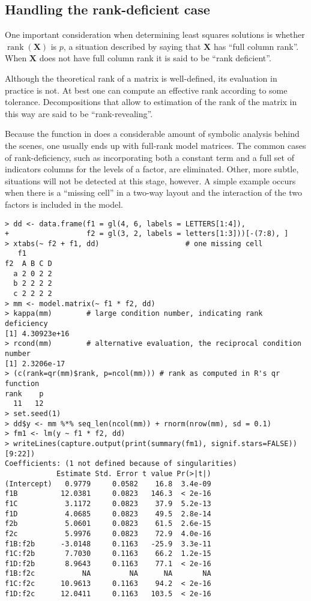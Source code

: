 \documentclass[shortnames,article,nojss]{jss}
\newcommand{\rank}{\operatorname{rank}}
\begin{document}
\subsection{Handling the rank-deficient case}
\label{sec:rankdeficient}

One important consideration when determining least squares solutions
is whether $\rank(\bm X)$ is $p$, a situation described by saying
that $\bm X$ has ``full column rank''.   When $\bm X$ does not have
full column rank it is said to be ``rank deficient''.

Although the theoretical rank of a matrix is well-defined, its
evaluation in practice is not.  At best one can compute an effective
rank according to some tolerance.  Decompositions that allow to
estimation of the rank of the matrix in this way are said to be
``rank-revealing''.

Because the  function in  does a
considerable amount of symbolic analysis behind the scenes, one usually
ends up with full-rank model matrices.  The common cases of
rank-deficiency, such as incorporating both a constant term and a full
set of indicators columns for the levels of a factor, are eliminated.
Other, more subtle, situations will not be detected at this stage,
however.  A simple example occurs when there is a ``missing cell'' in a
two-way layout and the interaction of the two factors is included in
the model.

\begin{verbatim}
> dd <- data.frame(f1 = gl(4, 6, labels = LETTERS[1:4]),
+                  f2 = gl(3, 2, labels = letters[1:3]))[-(7:8), ]
> xtabs(~ f2 + f1, dd)                    # one missing cell
   f1
f2  A B C D
  a 2 0 2 2
  b 2 2 2 2
  c 2 2 2 2
> mm <- model.matrix(~ f1 * f2, dd)
> kappa(mm)        # large condition number, indicating rank deficiency
[1] 4.30923e+16
> rcond(mm)        # alternative evaluation, the reciprocal condition number
[1] 2.3206e-17
> (c(rank=qr(mm)$rank, p=ncol(mm))) # rank as computed in R's qr function
rank    p 
  11   12 
> set.seed(1)
> dd$y <- mm %*% seq_len(ncol(mm)) + rnorm(nrow(mm), sd = 0.1)
> fm1 <- lm(y ~ f1 * f2, dd)
> writeLines(capture.output(print(summary(fm1), signif.stars=FALSE))[9:22])
Coefficients: (1 not defined because of singularities)
            Estimate Std. Error t value Pr(>|t|)
(Intercept)   0.9779     0.0582    16.8  3.4e-09
f1B          12.0381     0.0823   146.3  < 2e-16
f1C           3.1172     0.0823    37.9  5.2e-13
f1D           4.0685     0.0823    49.5  2.8e-14
f2b           5.0601     0.0823    61.5  2.6e-15
f2c           5.9976     0.0823    72.9  4.0e-16
f1B:f2b      -3.0148     0.1163   -25.9  3.3e-11
f1C:f2b       7.7030     0.1163    66.2  1.2e-15
f1D:f2b       8.9643     0.1163    77.1  < 2e-16
f1B:f2c           NA         NA      NA       NA
f1C:f2c      10.9613     0.1163    94.2  < 2e-16
f1D:f2c      12.0411     0.1163   103.5  < 2e-16
\end{verbatim}
\end{document}
